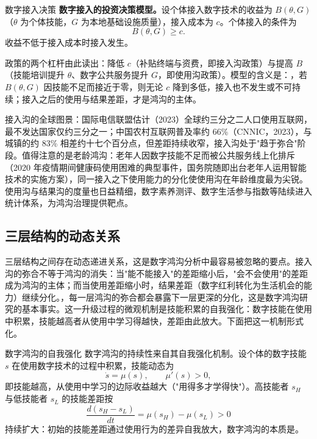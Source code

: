 \begin{derivation}{数字接入决策}{}
\textbf{数字接入的投资决策模型。}设个体接入数字技术的收益为 $B(\theta, G)$（$\theta$ 为个体技能，$G$ 为本地基础设施质量），接入成本为 $c$。个体接入的条件为
\[
B(\theta, G) \geq c.
\]
收益不低于接入成本时接入发生。
\end{derivation}

政策的两个杠杆由此读出：降低 $c$（补贴终端与资费，即接入沟政策）与提高 $B$（技能培训提升 $\theta$、数字公共服务提升 $G$，即使用沟政策）。模型的含义是：，若 $B(\theta, G)$ 因技能不足而接近于零，则无论 $c$ 降到多低，接入也不发生或不可持续；接入之后的使用与结果差距，才是鸿沟的主体。

接入沟的全球图景：国际电信联盟估计（2023）全球约三分之二人口使用互联网，最不发达国家仅约三分之一；中国农村互联网普及率约 66\%（CNNIC，2023），与城镇的约 83\% 相差约十七个百分点，但差距持续收窄，接入沟处于"趋于弥合"阶段。值得注意的是老龄鸿沟：老年人因数字技能不足而被公共服务线上化排斥（2020 年疫情期间健康码使用困难的典型事件，国务院随即出台老年人运用智能技术的实施方案），同一接入之下使用能力的分化使使用沟在年龄维度最为尖锐。使用沟与结果沟的度量也日益精细，数字素养测评、数字生活参与指数等陆续进入统计体系，为鸿沟治理提供靶点。

\subsection{三层结构的动态关系}

三层结构之间存在动态递进关系，这是数字鸿沟分析中最容易被忽略的要点。接入沟的弥合不等于鸿沟的消失：当"能不能接入"的差距缩小后，"会不会使用"的差距成为鸿沟的主体；而当使用差距缩小时，结果差距（数字红利转化为生活机会的能力）继续分化。，每一层鸿沟的弥合都会暴露下一层更深的分化，这是数字鸿沟研究的基本事实。这一升级过程的微观机制是技能积累的自我强化：数字技能在使用中积累，技能越高者从使用中学习得越快，差距由此放大。下面把这一机制形式化。

\begin{derivation}{数字鸿沟的自我强化}{}
数字鸿沟的持续性来自其自我强化机制。设个体的数字技能 $s$ 在使用数字技术的过程中积累，技能动态为
\[
\dot{s} = \mu(s), \qquad \mu'(s) > 0,
\]
即技能越高，从使用中学习的边际收益越大（"用得多才学得快"）。高技能者 $s_H$ 与低技能者 $s_L$ 的技能差距按
\[
\frac{d(s_H - s_L)}{dt} = \mu(s_H) - \mu(s_L) > 0
\]
持续扩大：初始的技能差距通过使用行为的差异自我放大，数字鸿沟的本质是。
\end{derivation}

